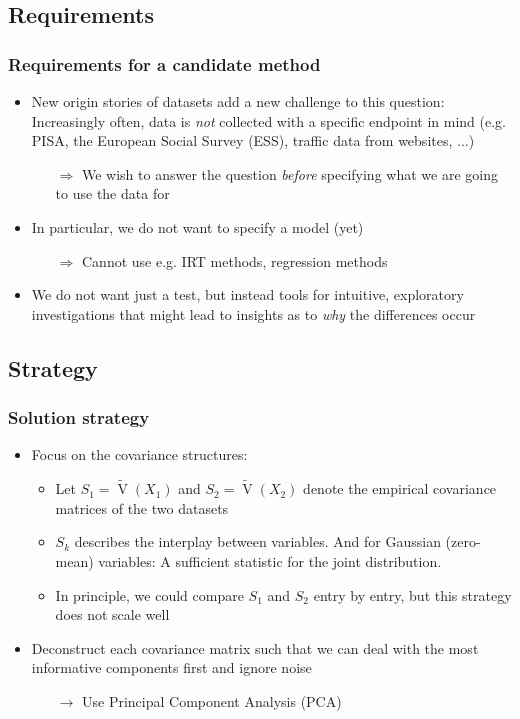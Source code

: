 \documentclass[a4]{beamer}
\DeclareMathOperator*{\V}{V}
\begin{document}
\subsection{Requirements}
\begin{frame}
\frametitle{Requirements for a candidate method}
\begin{itemize}
\item New origin stories of datasets add a new challenge to this question: Increasingly often, data is \textit{not} collected with a specific endpoint in mind (e.g. PISA, the European Social Survey (ESS), traffic data from websites, ...)
	\begin{itemize}
		\item[$\Rightarrow$] We wish to answer the question \textit{before} specifying what we are going to use the data for
	\end{itemize}
\item In particular, we do not want to specify a model (yet) 
	\begin{itemize}
		\item[$\Rightarrow$] Cannot use e.g. IRT methods, regression methods  
	\end{itemize}
\item We do not want just a test, but instead tools for intuitive, exploratory investigations that might lead to insights as to \textit{why} the differences occur 
\end{itemize}
\end{frame}

\subsection{Strategy}
\begin{frame}
\frametitle{Solution strategy}
\begin{itemize}
\item Focus on the covariance structures:
\begin{itemize}
\item Let $S_1 = \tilde{\V}(X_1)$ and $S_2 = \tilde{\V}(X_2)$ denote the empirical covariance matrices of the two datasets
\item $S_k$ describes the interplay between variables. And for Gaussian (zero-mean) variables: A sufficient statistic for the joint distribution.
\item In principle, we could compare $S_1$ and $S_2$ entry by entry, but this strategy does not scale well
\end{itemize}
\item Deconstruct each covariance matrix such that we can deal with the most informative components first and ignore noise
\begin{itemize}
\item[$\rightarrow$] Use Principal Component Analysis (PCA)
\end{itemize}
\end{itemize}
\end{frame}
\end{document}

